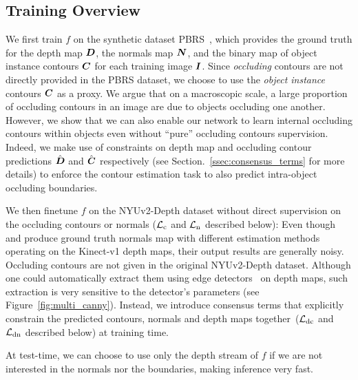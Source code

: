 \documentclass[10pt,twocolumn,letterpaper]{article}
\begin{document}
\subsection{Training Overview}

We first  train $f$  on the  synthetic dataset  PBRS~\cite{Zhang2016pbrs}, which
provides the ground truth for the depth map  $\boldsymbol{D}$, the normals map $\boldsymbol{N}$, 
and the binary map of object instance contours $\boldsymbol{C}$ for  each training  image 
$\boldsymbol{I}$. Since \textit{occluding} contours are not directly provided in the PBRS 
dataset, we choose to use the \textit{object instance} contours $\boldsymbol{C}$ as a 
proxy. We argue that on a macroscopic scale, a large proportion of occluding 
contours in an image are due to objects occluding one another.
However, we show that we can also enable our network to learn internal 
occluding contours within objects even without ``pure'' occluding contours 
supervision. Indeed, we make use of constraints on depth map and occluding 
contour predictions $\hat{\boldsymbol{D}}$ and $\hat{\boldsymbol{C}}$ respectively (see 
Section.~\ref{ssec:consensus_terms} for more details) to enforce the contour 
estimation task to also predict intra-object occluding boundaries.

We then finetune $f$ on the NYUv2-Depth dataset without direct supervision 
on the  occluding contours or normals  ($\mathcal{L}_{\text{c}}$ and $\mathcal{L}_{\text{n}}$
described  below): Even  though  \cite{LadickyCVPR14}  and \cite{Nyuv2}  produce
ground  truth normals  map with  different estimation  methods operating  on the
Kinect-v1  depth  maps, their  output  results  are generally  noisy.  Occluding
contours are not given in the  original NYUv2-Depth dataset.  Although one could
automatically extract  them using edge  detectors~\cite{Canny,StructuredEdge} on
depth maps, such extraction is very  sensitive to the detector's parameters (see
Figure~\ref{fig:multi_canny}).  Instead,  we introduce consensus terms  that
explicitly   constrain  the   predicted  contours,   normals  and   depth  maps
together~($\mathcal{L}_{\text{dc}}$ and $\mathcal{L}_{\text{dn}}$ described below) at training time.

At test-time, we can choose to use only the depth stream of $f$ if we are not
interested in the normals nor the boundaries, making inference very fast.
\end{document}
